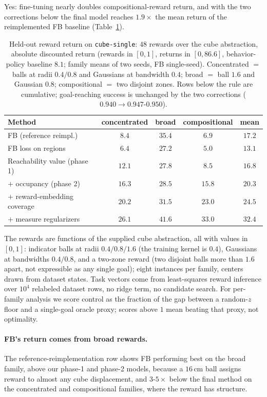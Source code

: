 \documentclass{article}
\begin{document}
Yes: fine-tuning nearly doubles compositional-reward return, and with the two corrections below the final model reaches $1.9\times$ the mean return of the reimplemented FB baseline (Table~\ref{tab:transfer}).

\begin{table}[t]
\centering\small
\begin{tabular}{l cccc}
\toprule
Method & concentrated & broad & compositional & mean \\
\midrule
FB (reference reimpl.)  & $8.4$ & $35.4$ & $6.9$ & $17.2$ \\
FB loss on regions      & $6.4$ & $27.2$ & $5.0$ & $13.1$ \\
\midrule
Reachability value (phase 1) & $12.1$ & $27.8$ & $8.5$  & $16.8$ \\
$+$ occupancy (phase 2)      & $16.3$ & $28.5$ & $15.8$ & $20.3$ \\
$+$ reward-embedding coverage & $20.2$ & $31.5$ & $23.0$ & $24.5$ \\
$+$ measure regularizers & $\mathbf{26.1}$ & $\mathbf{41.6}$ & $\mathbf{33.0}$ & $\mathbf{32.4}$ \\
\bottomrule
\end{tabular}
\caption{Held-out reward return on \texttt{cube-single}: $48$ rewards over the cube abstraction, absolute discounted return (rewards in $[0,1]$, returns in $[0,86.6]$, behavior-policy baseline $8.1$; family means of two seeds, FB single-seed).
Concentrated $=$ balls at radii $0.4/0.8$ and Gaussians at bandwidth $0.4$; broad $=$ ball $1.6$ and Gaussian $0.8$; compositional $=$ two disjoint zones.
Rows below the rule are cumulative; goal-reaching success is unchanged by the two corrections ($0.940\to0.947$-$0.950$).}
\label{tab:transfer}
\end{table}

The rewards are functions of the supplied cube abstraction, all with values in $[0,1]$: indicator balls at radii $0.4/0.8/1.6$ (the training kernel is $0.4$), Gaussians at bandwidths $0.4/0.8$, and a two-zone reward (two disjoint balls more than $1.6$ apart, not expressible as any single goal); eight instances per family, centers drawn from dataset states.
Task vectors come from least-squares reward inference over $10^4$ relabeled dataset rows, no ridge term, no candidate search.
For per-family analysis we score control as the fraction of the gap between a random-$z$ floor and a single-goal oracle proxy; scores above $1$ mean beating that proxy, not optimality.

\paragraph{FB's return comes from broad rewards.}
The reference-reimplementation row shows FB performing best on the broad family, above our phase-1 and phase-2 models, because a $16$\,cm ball assigns reward to almost any cube displacement, and $3$-$5\times$ below the final method on the concentrated and compositional families, where the reward has structure.
\end{document}
